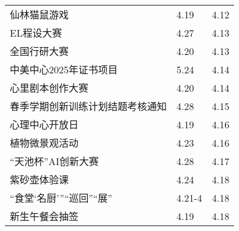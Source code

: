 \documentclass[letterpaper, 12pt]{article}
\begin{document}
\begin{multicols}{2}
{\begin{longtable}{|>{\centering\arraybackslash}m{}|m{}|m{}|}
    仙林猫鼠游戏 & 4.19 & 4.12\\
    EL程设大赛 & 4.27 & 4.13\\
    全国行研大赛 & 4.20 & 4.13\\
    中美中心2025年证书项目 & 5.24 & 4.14\\
    心里剧本创作大赛 & 4.20 & 4.14\\
    春季学期创新训练计划结题考核通知 & 4.28 & 4.15\\
    心理中心开放日 & 4.19 & 4.16\\
    植物微景观活动 & 4.23 & 4.16\\
    “天池杯”AI创新大赛 & 4.28 & 4.17\\
    紫砂壶体验课 & 4.24 & 4.18\\
    “食堂‘名厨’”“巡回”“展” & 4.21-4 & 4.18\\
    新生午餐会抽签 & 4.19 & 4.18\\
    \hline
\end{longtable}
\unskip
\unpenalty
\unpenalty}\unvbox\colbbox
\end{multicols}
\end{document}
